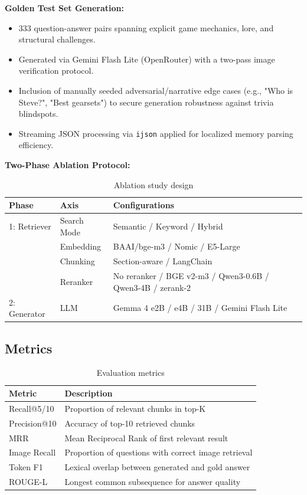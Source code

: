\documentclass[11pt,a4paper]{article}
\begin{document}
\textbf{Golden Test Set Generation:}
\begin{itemize}
    \item 333 question-answer pairs spanning explicit game mechanics, lore, and structural challenges.
    \item Generated via Gemini Flash Lite (OpenRouter) with a two-pass image verification protocol.
    \item Inclusion of manually seeded adversarial/narrative edge cases (e.g., "Who is Steve?", "Best gearsets") to secure generation robustness against trivia blindspots.
    \item Streaming JSON processing via \texttt{ijson} applied for localized memory parsing efficiency.
\end{itemize}

\textbf{Two-Phase Ablation Protocol:}

\begin{table}[h]
\caption{Ablation study design}
\label{tab:ablation}
\centering
\begin{tabular}{lll}
\toprule
\textbf{Phase} & \textbf{Axis} & \textbf{Configurations} \\
\midrule
1: Retriever & Search Mode & Semantic / Keyword / Hybrid \\
 & Embedding & BAAI/bge-m3 / Nomic / E5-Large \\
 & Chunking & Section-aware / LangChain \\
 & Reranker & No reranker / BGE v2-m3 / Qwen3-0.6B / Qwen3-4B / zerank-2 \\
\midrule
2: Generator & LLM & Gemma 4 e2B / e4B / 31B / Gemini Flash Lite \\
\bottomrule
\end{tabular}

\end{table}

\subsection{Metrics}

\begin{table}[h]
\caption{Evaluation metrics}
\label{tab:metrics}
\centering
\begin{tabular}{lp{8cm}}
\toprule
\textbf{Metric} & \textbf{Description} \\
\midrule
Recall@5/10 & Proportion of relevant chunks in top-K \\
Precision@10 & Accuracy of top-10 retrieved chunks \\
MRR & Mean Reciprocal Rank of first relevant result \\
Image Recall & Proportion of questions with correct image retrieval \\
Token F1 & Lexical overlap between generated and gold answer \\
ROUGE-L & Longest common subsequence for answer quality \\
\bottomrule
\end{tabular}

\end{table}
\end{document}
